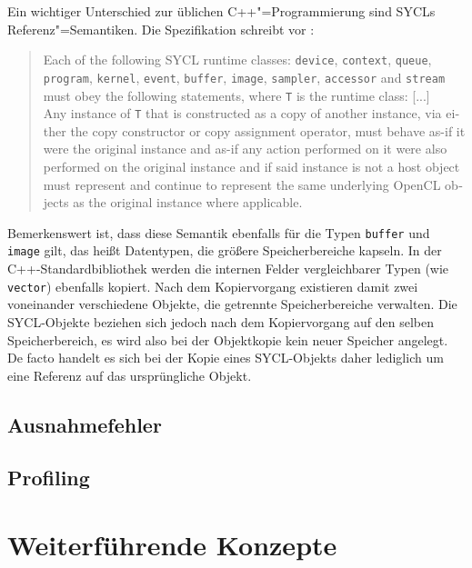 Ein wichtiger Unterschied zur üblichen C++"=Programmierung sind SYCLs
Referenz"=Semantiken. Die Spezifikation schreibt vor
\cite[siehe][Abschnitt 4.3.2]{sycl2019}:
\begin{otherlanguage}{english}
    \begin{quote}
        Each of the following SYCL runtime classes: \texttt{device},
        \texttt{context}, \texttt{queue}, \texttt{program}, \texttt{kernel},
        \texttt{event}, \texttt{buffer}, \texttt{image}, \texttt{sampler},
        \texttt{accessor} and \texttt{stream} must obey the following
        statements, where \texttt{T} is the runtime class: [...]
        \\
        Any instance of \texttt{T} that is constructed as a copy of another
        instance, via either the copy constructor or copy assignment operator,
        must behave as-if it were the original instance and as-if any action
        performed on it were also performed on the original instance and if said
        instance is not a host object must represent and continue to represent
        the same underlying OpenCL objects as the original instance where
        applicable.
    \end{quote}
\end{otherlanguage}
Bemerkenswert ist, dass diese Semantik ebenfalls für die Typen \texttt{buffer}
und \texttt{image} gilt, das heißt Datentypen, die größere Speicherbereiche
kapseln. In der C++-Standardbibliothek werden die internen Felder vergleichbarer
Typen (wie \texttt{vector}) ebenfalls kopiert. Nach dem Kopiervorgang existieren
damit zwei voneinander verschiedene Objekte, die getrennte Speicherbereiche
verwalten. Die SYCL-Objekte beziehen sich jedoch nach dem Kopiervorgang auf den
selben Speicherbereich, es wird also bei der Objektkopie kein neuer Speicher
angelegt. De facto handelt es sich bei der Kopie eines SYCL-Objekts daher
lediglich um eine Referenz auf das ursprüngliche Objekt.

\subsection{Ausnahmefehler}\label{sycl:api:exceptions}

\subsection{Profiling}\label{sycl:api:profiling}

\section{Weiterführende Konzepte}\label{sycl:konzepte}

